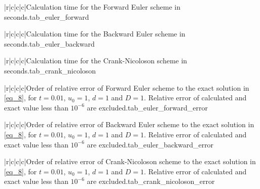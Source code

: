 \documentclass[11pt,english,a4paper]{article}
\begin{document}
\begin{flushleft}
\begin{tabell}{|r|c|c|c|}{\small}{}{}{Calculation time for the Forward Euler scheme in seconds.}{tab_euler_forward}
\end{tabell}

\begin{tabell}{|r|c|c|c|}{\small}{}{}{Calculation time for the Backward Euler scheme in seconds.}{tab_euler_backward}
\end{tabell}

\begin{tabell}{|r|c|c|c|}{\small}{}{}{Calculation time for the Crank-Nicoloson scheme in seconds.}{tab_crank_nicoloson}
\end{tabell}

\begin{tabell}{|r|c|c|c|}{\small}{}{}{Order of relative error of Forward Euler scheme to the exact solution in \eqref{eq_8}, for $t=0.01$, $u_0 = 1$, $d = 1$ and $D = 1$. Relative error of calculated and exact value less than $10^{-6}$ are excluded.}{tab_euler_forward_error}
\end{tabell}

\begin{tabell}{|r|c|c|c|}{\small}{}{}{Order of relative error of Backward Euler scheme to the exact solution in \eqref{eq_8}, for $t=0.01$, $u_0 = 1$, $d = 1$ and $D = 1$. Relative error of calculated and exact value less than $10^{-6}$ are excluded.}{tab_euler_backward_error}
\end{tabell}

\begin{tabell}{|r|c|c|c|}{\small}{}{}{Order of relative error of Crank-Nicoloson scheme to the exact solution in \eqref{eq_8}, for $t=0.01$, $u_0 = 1$, $d = 1$ and $D = 1$. Relative error of calculated and exact value less than $10^{-6}$ are excluded.}{tab_crank_nicoloson_error}
\end{tabell}


\end{flushleft}
\end{document}
